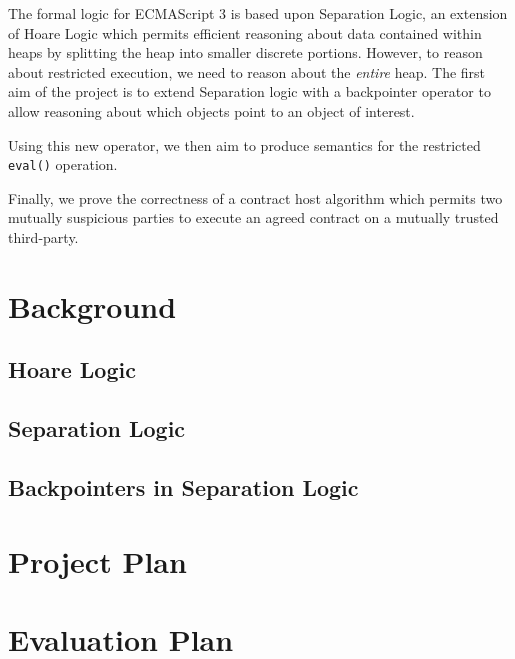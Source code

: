\documentclass[a4paper]{report}
\begin{document}
  The formal logic for ECMAScript 3 is based upon Separation Logic, an extension
  of Hoare Logic which permits efficient reasoning about data contained within
  heaps by splitting the heap into smaller discrete portions. However, to reason
  about restricted execution, we need to reason about the \emph{entire}
  heap. The first aim of the project is to extend Separation logic with a
  backpointer operator to allow reasoning about which objects point to an
  object of interest.

  Using this new operator, we then aim to produce semantics for the restricted
  \texttt{eval()} operation.

  Finally, we prove the correctness of a contract host algorithm which permits
  two mutually suspicious parties to execute an agreed contract on a mutually
  trusted third-party.




\chapter{Background}
\section{Hoare Logic}
\section{Separation Logic}
\section{Backpointers in Separation Logic}

\chapter{Project Plan}

\chapter{Evaluation Plan}
% 
\end{document}
